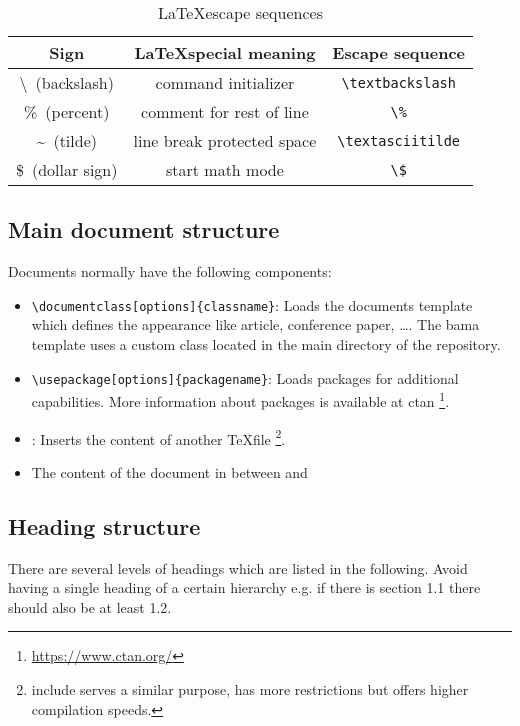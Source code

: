 \begin{table}[H]
	\centering
	\caption{\LaTeX escape sequences}
	\label{tab:escseq}
	\begin{tabular}{ccc}
		\toprule
		Sign & \LaTeX special meaning  & Escape sequence\\
		\midrule
		\textbackslash~(backslash) & command initializer & \verb|\textbackslash| \\
		\%~(percent) & comment for rest of line & \verb|\%| \\
		\textasciitilde~(tilde) & line break protected space & \verb|\textasciitilde| \\
		\$~(dollar sign) & start math mode & \verb|\$| \\			
		\bottomrule
	\end{tabular}
\end{table}

\subsection{Main document structure}

Documents normally have the following components:

\begin{itemize}
	\item \verb|\documentclass[options]{classname}|: Loads the documents template which defines the appearance like article, conference paper, \dots. The bama template uses a custom class located in the main directory of the repository.
	\item \verb|\usepackage[options]{packagename}|: Loads packages for additional capabilities. More information about packages is available at ctan \footnote{\url{https://www.ctan.org/}}.
	\item \verb||: Inserts the content of another \TeX file \footnote{include serves a similar purpose, has more restrictions but offers  higher compilation speeds.}.
	\item The content of the document in between \verb|| and \verb||
\end{itemize}

\subsection{Heading structure}

There are several levels of headings which are listed in the following. Avoid having a single heading of a certain hierarchy e.g. if there is section 1.1 there should also be at least 1.2.

